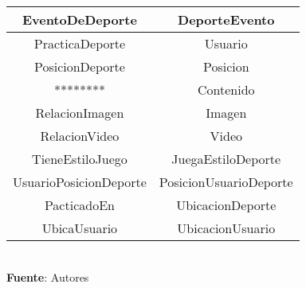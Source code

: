 \begin{table}[!htb]
\begin{center}
{\begin{tabular}{|p{4cm}|p{4cm}|p{4cm}|p{4cm}|}
			\multicolumn{2}{|c|}{EventoDeDeporte} & 
			\multicolumn{2}{c|}{DeporteEvento} \\
			\hline
			\multicolumn{2}{|c|}{PracticaDeporte} & 
			\multicolumn{2}{c|}{Usuario} \\
			\hline
			\multicolumn{2}{|c|}{PosicionDeporte} & 
			\multicolumn{2}{c|}{Posicion} \\
			\hline
			\multicolumn{2}{|c|}{********} & 
			\multicolumn{2}{c|}{Contenido} \\
			\hline
			\multicolumn{2}{|c|}{RelacionImagen} & 
			\multicolumn{2}{c|}{Imagen} \\
			\hline
			\multicolumn{2}{|c|}{RelacionVideo} & 
			\multicolumn{2}{c|}{Video} \\
			\hline
			\multicolumn{2}{|c|}{TieneEstiloJuego} & 
			\multicolumn{2}{c|}{JuegaEstiloDeporte} \\
			\hline
			\multicolumn{2}{|c|}{UsuarioPosicionDeporte} & 
			\multicolumn{2}{c|}{PosicionUsuarioDeporte} \\
			\hline
			\multicolumn{2}{|c|}{PacticadoEn} & 
			\multicolumn{2}{c|}{UbicacionDeporte} \\
			\hline
			\multicolumn{2}{|c|}{UbicaUsuario} & 
			\multicolumn{2}{c|}{UbicacionUsuario} \\
			\hline
		\end{tabular}
		} \\
		\textbf{Fuente}: Autores
	\end{center}
\end{table}